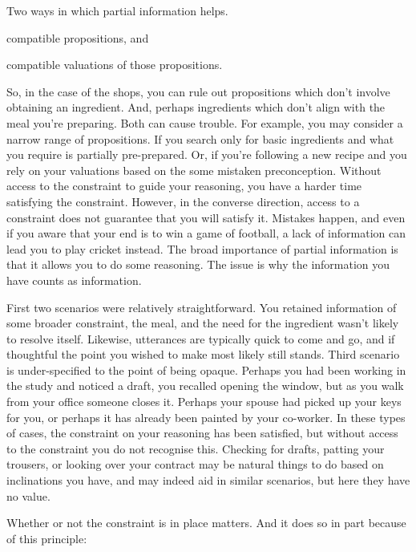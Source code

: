 \documentclass[10pt]{article}
\begin{document}
Two ways in which partial information helps.
\begin{enumerate*}[label=\arabic*.]
\item compatible propositions, and
\item compatible valuations of those propositions.
\end{enumerate*}
So, in the case of the shops, you can rule out propositions which don't involve obtaining an ingredient.
And, perhaps ingredients which don't align with the meal you're preparing.
Both can cause trouble.
For example, you may consider a narrow range of propositions.
If you search only for basic ingredients and what you require is partially pre-prepared.
Or, if you're following a new recipe and you rely on your valuations based on the some mistaken preconception.
Without access to the constraint to guide your reasoning, you have a harder time satisfying the constraint.
However, in the converse direction, access to a constraint does not guarantee that you will satisfy it.
Mistakes happen, and even if you aware that your end is to win a game of football, a lack of information can lead you to play cricket instead.
The broad importance of partial information is that it allows you to do some reasoning.
The issue is why the information you have counts as information.

First two scenarios were relatively straightforward.
You retained information of some broader constraint, the meal, and the need for the ingredient wasn't likely to resolve itself.
Likewise, utterances are typically quick to come and go, and if thoughtful the point you wished to make most likely still stands.
Third scenario is under-specified to the point of being opaque.
Perhaps you had been working in the study and noticed a draft, you recalled opening the window, but as you walk from your office someone closes it.
Perhaps your spouse had picked up your keys for you, or perhaps it has already been painted by your co-worker.
In these types of cases, the constraint on your reasoning has been satisfied, but without access to the constraint you do not recognise this.
Checking for drafts, patting your trousers, or looking over your contract may be natural things to do based on inclinations you have, and may indeed aid in similar scenarios, but here they have no value.

Whether or not the constraint is in place matters.
And it does so in part because of this principle:
\end{document}
